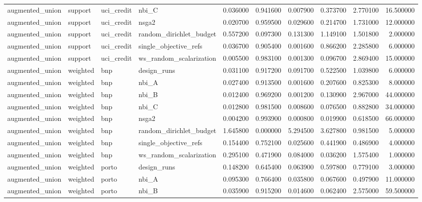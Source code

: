 \begin{landscape}
\begin{longtable}{llllrrrrrr}
augmented\_union & support & uci\_credit & nbi\_C & 0.036000 & 0.941600 & 0.007900 & 0.373700 & 2.770100 & 16.500000 \\
augmented\_union & support & uci\_credit & nsga2 & 0.020700 & 0.959500 & 0.029600 & 0.214700 & 1.731000 & 12.000000 \\
augmented\_union & support & uci\_credit & random\_dirichlet\_budget & 0.557200 & 0.097300 & 0.131300 & 1.149100 & 1.501800 & 2.000000 \\
augmented\_union & support & uci\_credit & single\_objective\_refs & 0.036700 & 0.905400 & 0.001600 & 0.866200 & 2.285800 & 6.000000 \\
augmented\_union & support & uci\_credit & ws\_random\_scalarization & 0.005500 & 0.983100 & 0.001300 & 0.096700 & 2.869400 & 15.000000 \\
augmented\_union & weighted & bnp & design\_runs & 0.031100 & 0.917200 & 0.091700 & 0.522500 & 1.039800 & 6.000000 \\
augmented\_union & weighted & bnp & nbi\_A & 0.027400 & 0.913500 & 0.001600 & 0.207600 & 0.825300 & 8.000000 \\
augmented\_union & weighted & bnp & nbi\_B & 0.012400 & 0.969200 & 0.001200 & 0.130900 & 2.967000 & 44.000000 \\
augmented\_union & weighted & bnp & nbi\_C & 0.012800 & 0.981500 & 0.008600 & 0.076500 & 0.882800 & 34.000000 \\
augmented\_union & weighted & bnp & nsga2 & 0.004200 & 0.993900 & 0.000800 & 0.019900 & 0.618500 & 66.000000 \\
augmented\_union & weighted & bnp & random\_dirichlet\_budget & 1.645800 & 0.000000 & 5.294500 & 3.627800 & 0.981500 & 5.000000 \\
augmented\_union & weighted & bnp & single\_objective\_refs & 0.154400 & 0.752100 & 0.025600 & 0.441900 & 0.486900 & 4.000000 \\
augmented\_union & weighted & bnp & ws\_random\_scalarization & 0.295100 & 0.471900 & 0.084000 & 0.036200 & 1.575400 & 1.000000 \\
augmented\_union & weighted & porto & design\_runs & 0.148200 & 0.645400 & 0.063900 & 0.597800 & 0.779100 & 3.000000 \\
augmented\_union & weighted & porto & nbi\_A & 0.095300 & 0.766400 & 0.035800 & 0.067600 & 0.497900 & 11.000000 \\
augmented\_union & weighted & porto & nbi\_B & 0.035900 & 0.915200 & 0.014600 & 0.062400 & 2.575000 & 59.500000 \\

\end{longtable}
\end{landscape}
